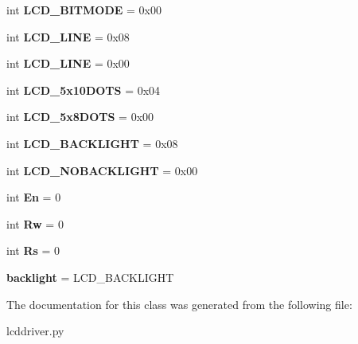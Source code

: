 \begin{DoxyCompactItemize}
\item 
\hypertarget{classdriver_1_1lcddriver_1_1LCD_ae21f4fea97e55c08d4cd9e3ee644de5e}{}int {\bfseries L\+C\+D\+\_\+B\+I\+T\+M\+O\+D\+E} = 0x00\label{classdriver_1_1lcddriver_1_1LCD_ae21f4fea97e55c08d4cd9e3ee644de5e}

\item 
\hypertarget{classdriver_1_1lcddriver_1_1LCD_acfb7374d380ac99f996b6ae4b7fc85d3}{}int {\bfseries L\+C\+D\+\_\+L\+I\+N\+E} = 0x08\label{classdriver_1_1lcddriver_1_1LCD_acfb7374d380ac99f996b6ae4b7fc85d3}

\item 
\hypertarget{classdriver_1_1lcddriver_1_1LCD_a0257b6dd1746ac7dcb991c25b9060413}{}int {\bfseries L\+C\+D\+\_\+L\+I\+N\+E} = 0x00\label{classdriver_1_1lcddriver_1_1LCD_a0257b6dd1746ac7dcb991c25b9060413}

\item 
\hypertarget{classdriver_1_1lcddriver_1_1LCD_ad0446494d53b4941d8c0b4903aaa066f}{}int {\bfseries L\+C\+D\+\_\+5x10\+D\+O\+T\+S} = 0x04\label{classdriver_1_1lcddriver_1_1LCD_ad0446494d53b4941d8c0b4903aaa066f}

\item 
\hypertarget{classdriver_1_1lcddriver_1_1LCD_a7b32a67aff00266d16e6f27916f55bda}{}int {\bfseries L\+C\+D\+\_\+5x8\+D\+O\+T\+S} = 0x00\label{classdriver_1_1lcddriver_1_1LCD_a7b32a67aff00266d16e6f27916f55bda}

\item 
\hypertarget{classdriver_1_1lcddriver_1_1LCD_a3e06c45ced35bec8ff543776b64cbee8}{}int {\bfseries L\+C\+D\+\_\+\+B\+A\+C\+K\+L\+I\+G\+H\+T} = 0x08\label{classdriver_1_1lcddriver_1_1LCD_a3e06c45ced35bec8ff543776b64cbee8}

\item 
\hypertarget{classdriver_1_1lcddriver_1_1LCD_a715b3e907a038f41e4c34318ecb400cf}{}int {\bfseries L\+C\+D\+\_\+\+N\+O\+B\+A\+C\+K\+L\+I\+G\+H\+T} = 0x00\label{classdriver_1_1lcddriver_1_1LCD_a715b3e907a038f41e4c34318ecb400cf}

\item 
\hypertarget{classdriver_1_1lcddriver_1_1LCD_a9053ef7d21f4f4bf75fd0669f5ef1871}{}int {\bfseries En} = 0\label{classdriver_1_1lcddriver_1_1LCD_a9053ef7d21f4f4bf75fd0669f5ef1871}

\item 
\hypertarget{classdriver_1_1lcddriver_1_1LCD_acd0d0ce3f9b3aa9d0a0c71c4436035e5}{}int {\bfseries Rw} = 0\label{classdriver_1_1lcddriver_1_1LCD_acd0d0ce3f9b3aa9d0a0c71c4436035e5}

\item 
\hypertarget{classdriver_1_1lcddriver_1_1LCD_a99b7db0cf5e9abd67898c5b63df45036}{}int {\bfseries Rs} = 0\label{classdriver_1_1lcddriver_1_1LCD_a99b7db0cf5e9abd67898c5b63df45036}

\item 
\hypertarget{classdriver_1_1lcddriver_1_1LCD_a98506805f23b68d88e5734f4a6e172e6}{}{\bfseries backlight} = L\+C\+D\+\_\+\+B\+A\+C\+K\+L\+I\+G\+H\+T\label{classdriver_1_1lcddriver_1_1LCD_a98506805f23b68d88e5734f4a6e172e6}

\end{DoxyCompactItemize}


The documentation for this class was generated from the following file\+:\begin{DoxyCompactItemize}
\item 
lcddriver.\+py\end{DoxyCompactItemize}
